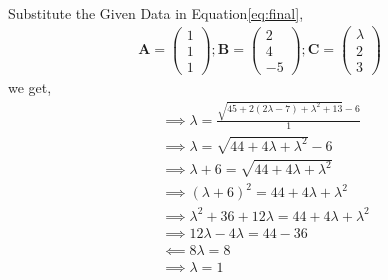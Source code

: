 \documentclass[11pt, a4paper]{article}
\newcommand{\myvec}[1]{\ensuremath{\begin{pmatrix}#1\end{pmatrix}}}
\let\vec\mathbf
\providecommand{\brak}[1]{\ensuremath{\left(#1\right)}}
\begin{document}
\begin{enumerate}
\begin{align}
\end{align}
Substitute the Given Data in Equation\eqref{eq:final},
\begin{align*}
\vec{A}=\myvec{1\\1\\1};\vec{B}=\myvec{2\\4\\-5};\vec{C}=\myvec{\lambda\\2\\3}
\end{align*}
we get,
\begin{align}   
&\implies\lambda=\frac{\sqrt{45+2\brak{2\lambda-7}+\lambda^2+13}-6}{1}\\
&\implies\lambda=\sqrt{44+4\lambda+\lambda^2}-6\\
&\implies\lambda+6=\sqrt{44+4\lambda+\lambda^2}\\
&\implies\brak{\lambda+6}^{2}=44+4\lambda+\lambda^2\\
&\implies\lambda^2+36+12\lambda=44+4\lambda+\lambda^2\\
&\implies12\lambda-4\lambda=44-36\\
&\impliedby8\lambda=8\\
 &\implies \lambda = 1
\end{align}
\end{enumerate}
\end{document}
